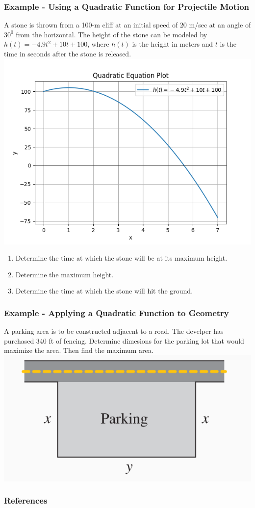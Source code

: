 \documentclass{beamer}
\begin{document}
\begin{frame}
    \frametitle{Example - Using a Quadratic Function for Projectile Motion}

    A stone is thrown from a 100-m cliff at an initial speed of \(20\) m/sec at an angle of \(30^0\) from the horizontal. The height of the stone can be modeled by \(h(t)=-4.9t^2 +10t +100\), where \(h(t)\) is the height in meters and \(t\) is the time in seconds after the stone is released. 
    \includegraphics[scale=0.2]{figs/Figure 4.png} 

    \begin{enumerate}
        \item Determine the time at which the stone will be at its maximum height.\pause
        \item Determine the maximum height. \pause
        \item Determine the time at which the stone will hit the ground. 
    \end{enumerate}

\end{frame}

\begin{frame}
    \frametitle{Example - Applying a Quadratic Function to Geometry}

    A parking area is to be constructed adjacent to a road. The develper has purchased 340 ft of fencing. Determine dimesions for the parking lot that would maximize the area. Then find the maximum area. \\
\includegraphics[scale=0.5]{figs/Figure 5.PNG}

\end{frame}



\begin{frame}
    \frametitle{References}
\end{frame}
\end{document}
